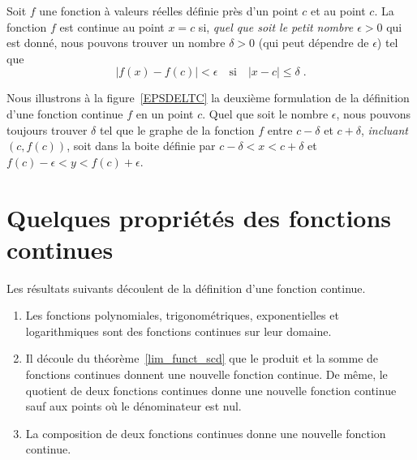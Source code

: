 {\begin{focus}{\dfn} 
Soit $f$ une fonction à valeurs réelles définie près d'un point $c$ et
au point $c$.  La fonction $f$ est continue au point $x=c$ si,
{\em quel que soit le petit nombre $\epsilon >0$} qui est donné, nous
pouvons trouver un nombre $\delta >0$ (qui peut dépendre de $\epsilon$)
tel que
\[
|f(x) - f(c)| < \epsilon \quad \text{si} \quad |x-c|\leq \delta \; .
\]
\end{focus}

\begin{rmk}
Nous illustrons à la figure~\ref{EPSDELTC} la deuxième formulation de la
définition d'une fonction continue $f$ en un point $c$.  Quel que soit
le nombre $\epsilon$, nous pouvons toujours trouver $\delta$ tel que le
graphe de la fonction $f$ entre $c-\delta$ et $c+\delta$,
{\em incluant $(c,f(c))$}, soit dans la boite définie par
$c-\delta < x < c+\delta$ et $f(c)-\epsilon < y < f(c)+\epsilon$.
\end{rmk}


\section{Quelques propriétés des fonctions continues}

Les résultats suivants découlent de la définition d'une fonction continue.

\begin{focus}{\prp}
\begin{enumerate}
\item Les fonctions polynomiales, trigonométriques, exponentielles et
  logarithmiques sont des fonctions continues sur leur domaine.
\item Il découle du théorème~\ref{lim_funct_scd} que le produit et la
  somme de fonctions continues donnent une nouvelle fonction continue.
  De même, le quotient de deux fonctions continues donne une nouvelle
  fonction continue sauf aux points où le dénominateur est nul.
\item La composition de deux fonctions continues donne une nouvelle
  fonction continue.
\end{enumerate}
\end{focus}

}
